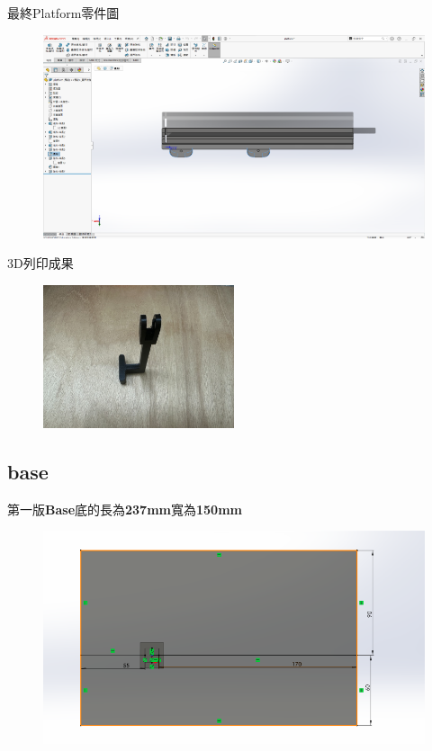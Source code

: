 \noindent 最終Platform零件圖

\begin{figure}[h!]
    \centering
    \includegraphics[width=1\textwidth]{./../images/6-1-22.png}
\end{figure}

\noindent 3D列印成果

\begin{figure}[h!]
    \centering
    \includegraphics[width=0.5\textwidth]{./../images/6-1-24.JPG}
\end{figure}

\subsection{base}
第一版\textbf{Base}底的長為\textbf{237mm}寬為\textbf{150mm}

\begin{figure}[h!]
    \centering
    \includegraphics[width=1\textwidth]{./../images/6-1-27.png}
\end{figure}

